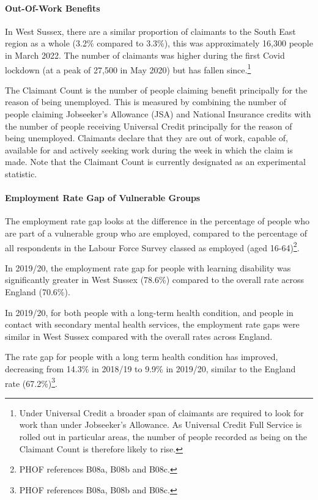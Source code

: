 \paragraph{Out-Of-Work Benefits} In West Sussex, there are a similar proportion of claimants to the South East region as a whole (3.2\% compared to 3.3\%), this was approximately 16,300 people in March 2022. The number of claimants was higher during the first Covid lockdown (at a peak of 27,500 in May 2020) but has fallen since.\footnote{Under Universal Credit a broader span of claimants are required to look for work than under Jobseeker's Allowance. As Universal Credit Full Service is rolled out in particular areas, the number of people recorded as being on the Claimant Count is therefore likely to rise.}

The Claimant Count is the number of people claiming benefit principally for the reason of being unemployed. This is measured by combining the number of people claiming Jobseeker's Allowance (JSA) and National Insurance credits with the number of people receiving Universal Credit principally for the reason of being unemployed. Claimants declare that they are out of work, capable of, available for and actively seeking work during the week in which the claim is made. Note that the Claimant Count is currently designated as an experimental statistic.

\paragraph{Employment Rate Gap of Vulnerable Groups}

The employment rate gap looks at the difference in the percentage of people who are part of a vulnerable group who are employed, compared to the percentage of all respondents in the Labour Force Survey classed as employed (aged 16-64)\footnote{PHOF references B08a, B08b and B08c.}.

In 2019/20, the employment rate gap for people with learning disability was significantly greater in West Sussex (78.6\%) compared to the overall rate across England (70.6\%).

In 2019/20, for both people with a long-term health condition, and people in contact with secondary mental health services, the employment rate gaps were similar in West Sussex compared with the overall rates across England.

The rate gap for people with a long term health condition has improved, decreasing from 14.3\% in 2018/19 to 9.9\% in 2019/20, similar to the England rate (67.2\%)\footnote{PHOF references B08a, B08b and B08c.}.


